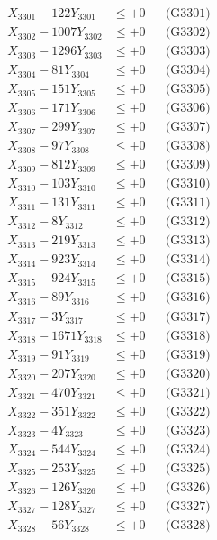 \documentclass[a4paper,10pt]{article}
\begin{document}
{\begin{align}
\allowbreak
X_{3301} - 122Y_{3301} &\leq +0 && \text{(G3301)} \\
X_{3302} - 1007Y_{3302} &\leq +0 && \text{(G3302)} \\
X_{3303} - 1296Y_{3303} &\leq +0 && \text{(G3303)} \\
X_{3304} - 81Y_{3304} &\leq +0 && \text{(G3304)} \\
X_{3305} - 151Y_{3305} &\leq +0 && \text{(G3305)} \\
X_{3306} - 171Y_{3306} &\leq +0 && \text{(G3306)} \\
X_{3307} - 299Y_{3307} &\leq +0 && \text{(G3307)} \\
X_{3308} - 97Y_{3308} &\leq +0 && \text{(G3308)} \\
X_{3309} - 812Y_{3309} &\leq +0 && \text{(G3309)} \\
X_{3310} - 103Y_{3310} &\leq +0 && \text{(G3310)} \\
\allowbreak
X_{3311} - 131Y_{3311} &\leq +0 && \text{(G3311)} \\
X_{3312} - 8Y_{3312} &\leq +0 && \text{(G3312)} \\
X_{3313} - 219Y_{3313} &\leq +0 && \text{(G3313)} \\
X_{3314} - 923Y_{3314} &\leq +0 && \text{(G3314)} \\
X_{3315} - 924Y_{3315} &\leq +0 && \text{(G3315)} \\
X_{3316} - 89Y_{3316} &\leq +0 && \text{(G3316)} \\
X_{3317} - 3Y_{3317} &\leq +0 && \text{(G3317)} \\
X_{3318} - 1671Y_{3318} &\leq +0 && \text{(G3318)} \\
X_{3319} - 91Y_{3319} &\leq +0 && \text{(G3319)} \\
X_{3320} - 207Y_{3320} &\leq +0 && \text{(G3320)} \\
\allowbreak
X_{3321} - 470Y_{3321} &\leq +0 && \text{(G3321)} \\
X_{3322} - 351Y_{3322} &\leq +0 && \text{(G3322)} \\
X_{3323} - 4Y_{3323} &\leq +0 && \text{(G3323)} \\
X_{3324} - 544Y_{3324} &\leq +0 && \text{(G3324)} \\
X_{3325} - 253Y_{3325} &\leq +0 && \text{(G3325)} \\
X_{3326} - 126Y_{3326} &\leq +0 && \text{(G3326)} \\
X_{3327} - 128Y_{3327} &\leq +0 && \text{(G3327)} \\
X_{3328} - 56Y_{3328} &\leq +0 && \text{(G3328)} \\

\end{align}}
\end{document}
